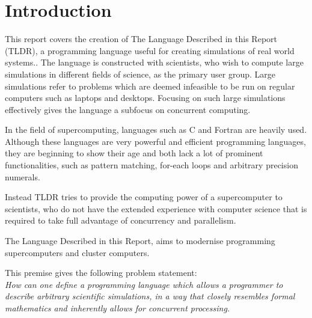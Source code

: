 \chapter{Introduction}\label{part:introduction}

This report covers the creation of The Language Described in this Report (TLDR), a programming language useful for creating simulations of real world systems.. The language is constructed with scientists, who wish to compute large simulations in different fields of science, as the primary user group. Large simulations refer to problems which are deemed infeasible to be run on regular computers such as laptops and desktops. Focusing on such large simulations effectively gives the language a subfocus on concurrent computing.

In the field of supercomputing, languages such as C and Fortran are heavily used. Although these languages  are very powerful and efficient programming languages, they are beginning to show their age and both lack a lot of prominent functionalities, such as pattern matching, for-each loops and arbitrary precision numerals. 

Instead TLDR tries to provide the computing power of a supercomputer to scientists, who do not have the extended experience with computer science that is required to take full advantage of concurrency and parallelism.

The Language Described in this Report, aims to modernise programming supercomputers and cluster computers.

This premise gives the following problem statement:
\\

\emph{How can one define a programming language which allows a programmer to describe arbitrary scientific simulations, in a way that closely resembles formal mathematics and inherently allows for concurrent processing.}
